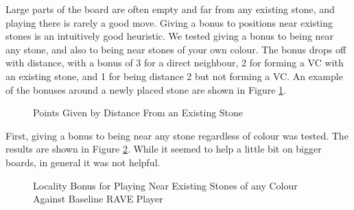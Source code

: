 Large parts of the board are often empty and far from any existing stone, and playing there is rarely a good move. Giving a bonus to positions near existing stones is an intuitively good heuristic. We tested giving a bonus to being near any stone, and also to being near stones of your own colour. The bonus drops off with distance, with a bonus of 3 for a direct neighbour, 2 for forming a VC with an existing stone, and 1 for being distance 2 but not forming a VC. An example of the bonuses around a newly placed stone are shown in Figure \ref{fig:localitypoints}.


\begin{figure}
	\centering
	\begin{HavannahBoard}[board size=3,coordinate style=classical,show coordinates=false]
	\end{HavannahBoard}
	\caption{Points Given by Distance From an Existing Stone}
	\label{fig:localitypoints}
\end{figure}


First, giving a bonus to being near any stone regardless of colour was tested. The results are shown in Figure \ref{fig:localityany}. While it seemed to help a little bit on bigger boards, in general it was not helpful.

\begin{figure}
	\centering
{}
	\caption[Locality Bonus, Any Stones]{Locality Bonus for Playing Near Existing Stones of any Colour Against Baseline RAVE Player}
	\label{fig:localityany}
\end{figure}

